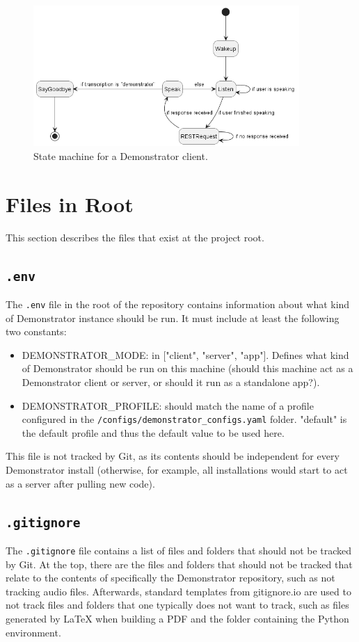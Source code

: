 \begin{figure}[h]
    \centering
    \includegraphics[width=0.9\textwidth]{../diagrams/state_client.png}
    \caption{State machine for a Demonstrator client.}
    \label{fig:state_client}
\end{figure}

\section{Files in Root}
This section describes the files that exist at the project root.

\subsection{\texttt{.env}}
The \texttt{.env} file in the root of the repository contains information about what kind of Demonstrator instance should be run.
It must include at least the following two constants:
\begin{itemize}
    \item DEMONSTRATOR\_MODE: in ["client", "server", "app"]. Defines what kind of Demonstrator should be run on this machine (should this machine act as a Demonstrator client or server, or should it run as a standalone app?).
    \item DEMONSTRATOR\_PROFILE: should match the name of a profile configured in the \texttt{/configs/demonstrator\_configs.yaml} folder. "default" is the default profile and thus the default value to be used here.
\end{itemize}
This file is not tracked by Git, as its contents should be independent for every Demonstrator install (otherwise, for example, all installations would start to act as a server after pulling new code).

\subsection{\texttt{.gitignore}}
The \texttt{.gitignore} file contains a list of files and folders that should not be tracked by Git.
At the top, there are the files and folders that should not be tracked that relate to the contents of specifically the Demonstrator repository, such as not tracking audio files.
Afterwards, standard templates from gitignore.io are used to not track files and folders that one typically does not want to track, such as files generated by LaTeX when building a PDF and the folder containing the Python environment.

